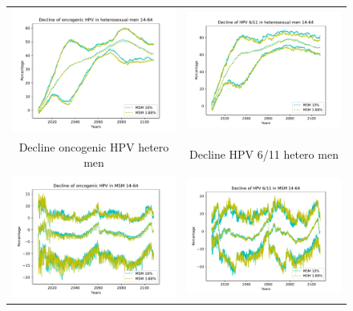 \begin{figure}[!]
	\centering
	\begin{tabular}{cc}
		\includegraphics[width=0.5\linewidth]{IMGs/13.-Aumento_MSM/onco_hom_hetero.pdf}	& 
		\includegraphics[width=0.5\linewidth]{IMGs/13.-Aumento_MSM/verr_hom_hetero.pdf}  \\ 
		Decline oncogenic HPV hetero men	& Decline HPV 6/11 hetero men \\ 
		\includegraphics[width=0.5\linewidth]{IMGs/13.-Aumento_MSM/onco_MSM.pdf}	& 
		\includegraphics[width=0.5\linewidth]{IMGs/13.-Aumento_MSM/verr_MSM.pdf}  \\ 

\end{tabular}
\end{figure}
